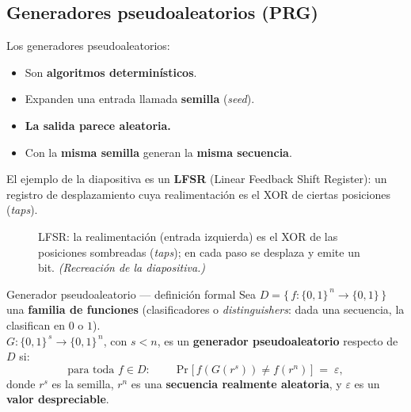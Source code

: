 \documentclass[11pt,a4paper]{article}
\newcommand{\xor}{\oplus}
\newcommand{\bits}{\{0,1\}}
\begin{document}
\subsection{Generadores pseudoaleatorios (PRG)}

\begin{slidebox}
Los generadores pseudoaleatorios:
\begin{itemize}[leftmargin=1.3em,itemsep=1pt]
  \item Son \textbf{algoritmos determinísticos}.
  \item Expanden una entrada llamada \textbf{semilla} (\emph{seed}).
  \item \textbf{La salida parece aleatoria.}
  \item Con la \textbf{misma semilla} generan la \textbf{misma secuencia}.
\end{itemize}
\end{slidebox}

El ejemplo de la diapositiva es un \textbf{LFSR} (Linear Feedback Shift Register): un
registro de desplazamiento cuya realimentación es el XOR de ciertas posiciones (\emph{taps}).

\begin{figure}[h]
\centering
{}
\caption{LFSR: la realimentación (entrada izquierda) es el XOR de las posiciones
sombreadas (\emph{taps}); en cada paso se desplaza y emite un bit.
\textit{(Recreación de la diapositiva.)}}
\end{figure}

\begin{defbox}{Generador pseudoaleatorio — definición formal}
Sea $D=\{\,f:\bits^{\,n}\to\bits\,\}$ una \textbf{familia de funciones} (clasificadores
o \emph{distinguishers}: dada una secuencia, la clasifican en $0$ o $1$).\\[3pt]
$G:\bits^{\,s}\to\bits^{\,n}$, con $s<n$, es un \textbf{generador pseudoaleatorio} respecto
de $D$ si:
\[
  \text{para toda } f\in D:\qquad
  \Pr\big[\, f(G(r^s)) \neq f(r^n)\,\big] \;=\; \varepsilon,
\]
donde $r^s$ es la semilla, $r^n$ es una \textbf{secuencia realmente aleatoria}, y
$\varepsilon$ es un \textbf{valor despreciable}.
\end{defbox}
\end{document}
